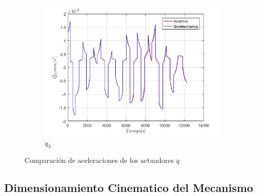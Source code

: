 \begin{figure}
\begin{subfigure}{0.45\textwidth}
        \includegraphics[width=\linewidth]{Cap4_DisenoBasico/Figura/ComparativoSimMechanics/QPPunto3.jpg}
        \caption{$\ddot{q}_3$}
    \end{subfigure}
    \caption{Comparación de aceleraciones de los actuadores $\ddot{q}$}
\end{figure}

\newpage
\subsection{Dimensionamiento Cinematico del Mecanismo}


\newpage
